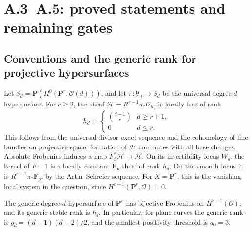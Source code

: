 \section{A.3--A.5: proved statements and remaining gates}
\label{sec:monodromy-contribution}

\subsection{Conventions and the generic rank for projective hypersurfaces}

Let $S_d=\mathbf P(H^0(\mathbf P^r,\mathcal O(d)))$, and let
$\pi:\mathcal Y_d\to S_d$ be the universal degree-$d$ hypersurface.
For $r\geq2$, the sheaf $\mathcal H=R^{r-1}\pi_*\mathcal O_{\mathcal Y_d}$
is locally free of rank
\[
 h_d=\begin{cases}\binom{d-1}{r}&d\geq r+1,\\0&d\leq r.\end{cases}
\]
This follows from the universal divisor exact sequence and the cohomology
of line bundles on projective space; formation of $\mathcal H$ commutes
with all base changes.  Absolute Frobenius induces a map
$F_S^*\mathcal H\to\mathcal H$.  On its invertibility locus $W_d$, the
kernel of $F-1$ is a locally constant $\mathbf F_p$-sheaf of rank $h_d$.
On the smooth locus it is $R^{r-1}\pi_*\mathbf F_p$, by the
Artin--Schreier sequence.  For $X=\mathbf P^r$, this is the vanishing
local system in the question, since $H^{r-1}(\mathbf P^r,\mathcal O)=0$.

\begin{proposition}\label{prop:projective-generic-hw-rank}
The generic degree-$d$ hypersurface of $\mathbf P^r$ has bijective
Frobenius on $H^{r-1}(\mathcal O)$, and its generic stable rank is $h_d$.
In particular, for plane curves the generic rank is
$g_d=(d-1)(d-2)/2$, and the smallest positivity threshold is $d_0=3$.
\end{proposition}

